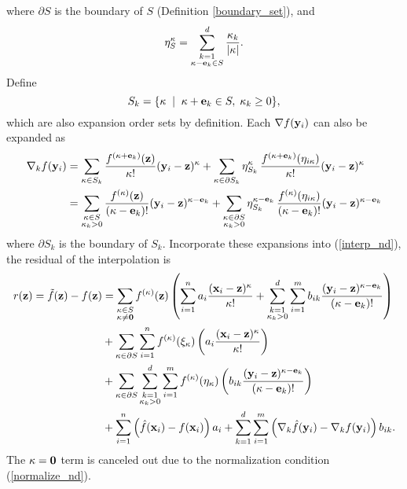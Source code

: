 where $\partial S$ is the boundary of $S$ (Definition \ref{boundary_set}), and
\[ \eta^\kappa_S = \sum_{\substack{k=1\\ \kappa-\mathbf{e}_k\in S}}^d
   \frac{\kappa_k}{|\kappa|} . \]
Define \[S_k = \{ \kappa \;\mid\; \kappa + \mathbf{e}_k \in S, \; \kappa_k \ge 0 \} ,\]
which are also expansion order sets by definition.
Each $\nabla f(\mathbf{y}_i)$ can also be expanded as
\[ \begin{split}
   \nabla_k f(\mathbf{y}_i)
&= \sum_{\kappa\in S_k} \frac{f^{(\kappa+\mathbf{e}_k)}(\mathbf{z})}{\kappa!} (\mathbf{y}_i-\mathbf{z})^\kappa
 + \sum_{\kappa\in \partial S_k} \eta^\kappa_{S_k} \,
   \frac{f^{(\kappa+\mathbf{e}_k)}(\eta_{i\kappa})}{\kappa!} (\mathbf{y}_i-\mathbf{z})^\kappa \\
&= \sum_{\substack{\kappa\in S\\ \kappa_k>0}}
   \frac{f^{(\kappa)}(\mathbf{z})}{(\kappa-\mathbf{e}_k)!} (\mathbf{y}_i-\mathbf{z})^{\kappa-\mathbf{e}_k}
 + \sum_{\substack{\kappa\in \partial S\\ \kappa_k>0}}
   \eta^{\kappa-\mathbf{e}_k}_{S_k} \,
   \frac{f^{(\kappa)}(\eta_{i\kappa})}{(\kappa-\mathbf{e}_k)!} (\mathbf{y}_i-\mathbf{z})^{\kappa-\mathbf{e}_k}
\end{split} \]
where $\partial S_k$ is the boundary of $S_k$.
Incorporate these expansions into (\ref{interp_nd}),
the residual of the interpolation is
\[ \begin{split}
  r(\mathbf{z}) = {\tilde f}(\mathbf{z}) - f(\mathbf{z}) 
&= \sum_{\substack{\kappa\in S\\ \kappa\ne\mathbf{0}}} f^{(\kappa)}(\mathbf{z})
   \left(\sum_{i=1}^n a_i \frac{(\mathbf{x}_i-\mathbf{z})^\kappa}{\kappa!}
       + \sum_{\substack{k=1\\ \kappa_k>0}}^d \sum_{i=1}^m b_{ik}
         \frac{(\mathbf{y}_i-\mathbf{z})^{\kappa-\mathbf{e}_k}}{(\kappa-\mathbf{e}_k)!} \right) \\
&+ \sum_{\kappa\in \partial S} \sum_{i=1}^n f^{(\kappa)}(\xi_\kappa)
   \left( a_i \frac{(\mathbf{x}_i-\mathbf{z})^\kappa}{\kappa!} \right) \\
&+ \sum_{\kappa\in \partial S}
   \sum_{\substack{k=1\\ \kappa_k>0}}^d \sum_{i=1}^m f^{(\kappa)}(\eta_\kappa)
   \left( b_{ik} \frac{(\mathbf{y}_i-\mathbf{z})^{\kappa-\mathbf{e}_k}}{(\kappa-\mathbf{e}_k)!} \right) \\
&+ \sum_{i=1}^n \left({\hat f}(\mathbf{x}_i) - f(\mathbf{x}_i)\right) a_i
 + \sum_{k=1}^d \sum_{i=1}^m
   \left(\nabla_k {\hat f}(\mathbf{y}_i) - \nabla_k f(\mathbf{y}_i)\right) b_{ik} .
\end{split} \]
The $\kappa=\mathbf{0}$ term is canceled out due to the normalization
condition (\ref{normalize_nd}).

